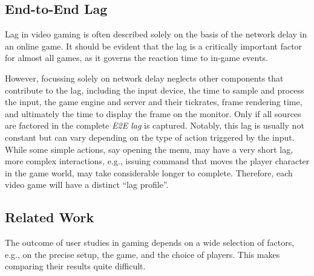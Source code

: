 
\subsection{End-to-End Lag}
\label{sec:e2e-lag}

Lag in video gaming is often described solely on the basis of the network delay in an online game. It should be evident that the lag is a critically important factor for almost all games, as it governs the reaction time to in-game events.

However, focussing solely on network delay neglects other components that contribute to the lag, including the input device, the time to sample and process the input, the game engine and server and their tickrates, frame rendering time, and ultimately the time to display the frame on the monitor. Only if all sources are factored in the complete \textit{\gls{E2E} lag} is captured. Notably, this lag is usually not constant but can vary depending on the type of action triggered by the input. While some simple actions, say opening the menu, may have a very short lag, more complex interactions, e.g., issuing command that moves the player character in the game world, may take considerable longer to complete. %
Therefore, each video game will have a distinct ``lag profile''.





\subsection{Related Work}
\label{sec:relatedwork}

The outcome of user studies in gaming depends on a wide selection of factors, e.g., on the precise setup, the game, and the choice of players. This makes comparing their results quite difficult.

